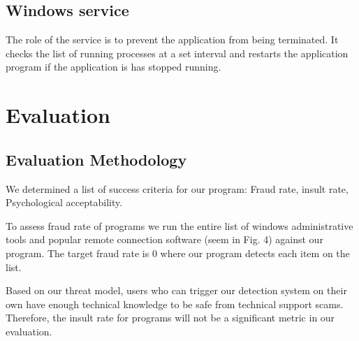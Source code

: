 \documentclass[final]{IEEEtran}
\begin{document}
\subsection{Windows service}
The role of the service is to prevent the application from being terminated. It checks the list of running processes at a set interval and restarts the application program if the application is has stopped running.

\section{Evaluation} %
%




\subsection{Evaluation Methodology}

We determined a list of success criteria for our program: Fraud rate, insult rate, Psychological acceptability.

To assess fraud rate of programs we run the entire list of windows administrative tools and popular remote connection software (seem in Fig. 4) against our program. The target fraud rate is 0 where our program detects each item on the list.

Based on our threat model, users who can trigger our detection system on their own have enough technical knowledge to be safe from technical support scams. Therefore, the insult rate for programs will not be a significant metric in our evaluation. 
\end{document}
